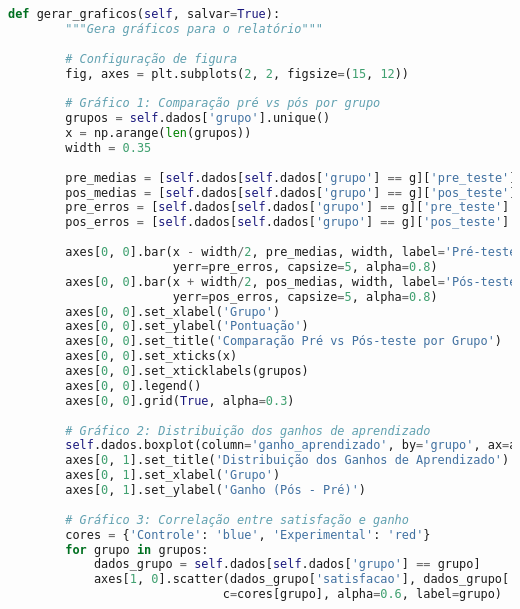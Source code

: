 \begin{pythonbox}
\begin{lstlisting}[language=Python]
    def gerar_graficos(self, salvar=True):
        """Gera gráficos para o relatório"""
        
        # Configuração de figura
        fig, axes = plt.subplots(2, 2, figsize=(15, 12))
        
        # Gráfico 1: Comparação pré vs pós por grupo
        grupos = self.dados['grupo'].unique()
        x = np.arange(len(grupos))
        width = 0.35
        
        pre_medias = [self.dados[self.dados['grupo'] == g]['pre_teste'].mean() for g in grupos]
        pos_medias = [self.dados[self.dados['grupo'] == g]['pos_teste'].mean() for g in grupos]
        pre_erros = [self.dados[self.dados['grupo'] == g]['pre_teste'].std() for g in grupos]
        pos_erros = [self.dados[self.dados['grupo'] == g]['pos_teste'].std() for g in grupos]
        
        axes[0, 0].bar(x - width/2, pre_medias, width, label='Pré-teste', 
                       yerr=pre_erros, capsize=5, alpha=0.8)
        axes[0, 0].bar(x + width/2, pos_medias, width, label='Pós-teste', 
                       yerr=pos_erros, capsize=5, alpha=0.8)
        axes[0, 0].set_xlabel('Grupo')
        axes[0, 0].set_ylabel('Pontuação')
        axes[0, 0].set_title('Comparação Pré vs Pós-teste por Grupo')
        axes[0, 0].set_xticks(x)
        axes[0, 0].set_xticklabels(grupos)
        axes[0, 0].legend()
        axes[0, 0].grid(True, alpha=0.3)
        
        # Gráfico 2: Distribuição dos ganhos de aprendizado
        self.dados.boxplot(column='ganho_aprendizado', by='grupo', ax=axes[0, 1])
        axes[0, 1].set_title('Distribuição dos Ganhos de Aprendizado')
        axes[0, 1].set_xlabel('Grupo')
        axes[0, 1].set_ylabel('Ganho (Pós - Pré)')
        
        # Gráfico 3: Correlação entre satisfação e ganho
        cores = {'Controle': 'blue', 'Experimental': 'red'}
        for grupo in grupos:
            dados_grupo = self.dados[self.dados['grupo'] == grupo]
            axes[1, 0].scatter(dados_grupo['satisfacao'], dados_grupo['ganho_aprendizado'],
                              c=cores[grupo], alpha=0.6, label=grupo)

   \end{lstlisting}
\end{pythonbox}

